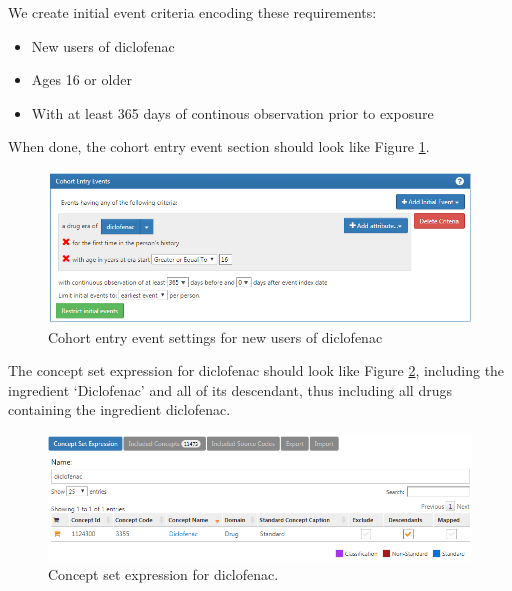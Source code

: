 \documentclass[11pt]{book}
\providecommand{\tightlist}{%
  \setlength{\itemsep}{0pt}\setlength{\parskip}{0pt}}
\theoremstyle{definition}
\theoremstyle{definition}
\theoremstyle{definition}
\theoremstyle{remark}
\begin{document}
We create initial event criteria encoding these requirements:

\begin{itemize}
\tightlist
\item
  New users of diclofenac
\item
  Ages 16 or older
\item
  With at least 365 days of continous observation prior to exposure
\end{itemize}

When done, the cohort entry event section should look like Figure \ref{fig:cohortsAtlasInitialEvents}.

\begin{figure}

{\centering \includegraphics[width=1\linewidth]{images/SuggestedAnswers/cohortsAtlasInitialEvents} 

}

\caption{Cohort entry event settings for new users of diclofenac}\label{fig:cohortsAtlasInitialEvents}
\end{figure}

The concept set expression for diclofenac should look like Figure \ref{fig:cohortsAtlasConceptSet1}, including the ingredient `Diclofenac' and all of its descendant, thus including all drugs containing the ingredient diclofenac.

\begin{figure}

{\centering \includegraphics[width=1\linewidth]{images/SuggestedAnswers/cohortsAtlasConceptSet1} 

}

\caption{Concept set expression for diclofenac.}\label{fig:cohortsAtlasConceptSet1}
\end{figure}
\end{document}
